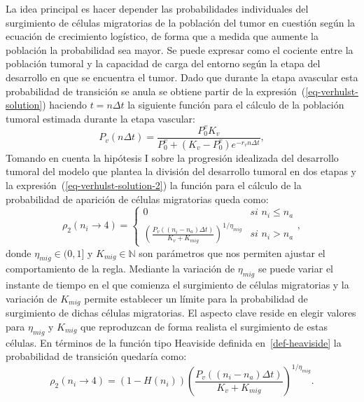 La idea principal es hacer depender las probabilidades individuales del surgimiento de c\'elulas migratorias de la poblaci\'on del tumor en cuesti\'on seg\'un la ecuaci\'on de crecimiento log\'istico, de forma que a medida que aumente la poblaci\'on la probabilidad sea mayor. Se puede expresar como el cociente entre la poblaci\'on tumoral y la capacidad de carga del entorno seg\'un la etapa del desarrollo en que se encuentra el tumor. Dado que durante la etapa avascular esta probabilidad de transici\'on se anula se obtiene partir de la expresi\'on~(\ref{eq-verhulst-solution}) haciendo $t=n\Delta t$ la siguiente funci\'on para el c\'alculo de la poblaci\'on tumoral estimada durante la etapa vascular:
\begin{equation}
P_v(n \Delta t) = \frac{P_0^v K_v}{P_0^v + (K_v-P_0^v)e^{-r_v n \Delta t}}, \label{eq-verhulst-solution-2}
\end{equation}
Tomando en cuenta la hip\'otesis I sobre la progresi\'on idealizada del desarrollo tumoral del modelo que plantea la divisi\'on del desarrollo tumoral en dos etapas y la expresi\'on~(\ref{eq-verhulst-solution-2}) la funci\'on para el c\'alculo de la probabilidad de aparici\'on de c\'elulas migratorias queda como:
\begin{equation}
\rho_2(n_i \rightarrow 4) = \left\lbrace
	\begin{array}{cl}
		0& \textit{si } n_i \leq n_a \\
		\left( \displaystyle\frac{P_v((n_i - n_a) \Delta t)}{K_v + K_{mig}} \right)^{\displaystyle 1 / \eta_{mig}}& \textit{si } n_i>n_a
	\end{array}
\right., \label{eq-migrant-2}
\end{equation}
donde $\eta_{mig} \in (0,1]$ y $K_{mig} \in \mathbb{N}$ son par\'ametros que nos permiten ajustar el comportamiento de la regla. Mediante la variaci\'on de $\eta_{mig}$ se puede variar el instante de tiempo en el que comienza el surgimiento de c\'elulas migratorias y la variaci\'on de $K_{mig}$ permite establecer un l\'imite para la probabilidad de surgimiento de dichas c\'elulas migratorias. El aspecto clave reside en elegir valores para $\eta_{mig}$ y $K_{mig}$ que reproduzcan de forma realista el surgimiento de estas c\'elulas. En t\'erminos de la funci\'on tipo Heaviside definida en~\ref{def-heaviside} la probabilidad de transici\'on quedar\'ia como:
\begin{equation}
\rho_2(n_i \rightarrow 4) = (1-H(n_i)) \left( \displaystyle\frac{P_v((n_i - n_a) \Delta t)}{K_v + K_{mig}} \right)^{\displaystyle 1/\eta_{mig}}. \label{eq-migrant-3}
\end{equation}

